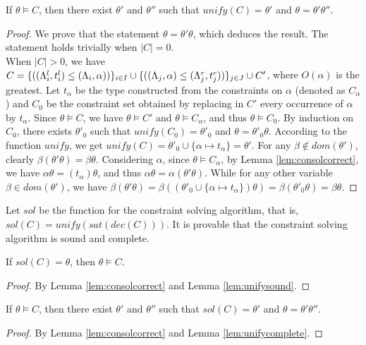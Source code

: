 {{{\begin{lemma}\label{lem:unifycomplete}
If $\theta \vDash C$, then there exist $\theta'$ and $\theta''$ such that $unify(C) = \theta'$ and $\theta = \theta'\theta''$.
\end{lemma}
\begin{proof}
We prove that the statement $\theta = \theta'\theta$, which deduces the result. The statement holds trivially when $|C| = 0$. \\
When $|C| > 0$, we have $C = \{((\Lambda_i^l,t_i^l)\leq(\Lambda_i,\alpha))\}_{i\in I} \cup \{((\Lambda_j,\alpha)\leq(\Lambda_j^r,t_j^r))\}_{j\in J}\cup C'$, where $O(\alpha)$ is the greatest.
Let $t_\alpha$ be the type constructed from the constraints on $\alpha$ (denoted as $C_{\alpha}$) and $C_0$ be the constraint set obtained by replacing in $C'$ every occurrence of $\alpha$ by $t_{\alpha}$.
Since $\theta \vDash C$, we have $\theta\vDash C'$ and $\theta \vDash  C_{\alpha}$,
and  thus $\theta\vDash C_0$.
By induction on $C_0$, there exists $\theta'_0$ such that $unify(C_0) = \theta'_0$ and $\theta = \theta'_0\theta$.
According to the function $unify$, we get $unify(C) = \theta'_0\cup\{\alpha\mapsto t_\alpha\} =\theta'$.
For any $\beta\notin dom(\theta')$, clearly $\beta(\theta'\theta) = \beta\theta$.
Considering $\alpha$, since $\theta\vDash C_{\alpha}$, by Lemma \ref{lem:consolcorrect}, we have $\alpha\theta =  (t_\alpha)\theta$, and thus $\alpha\theta = \alpha(\theta'\theta)$.
While for any other variable $\beta \in dom(\theta')$, we have
$\beta(\theta'\theta) = \beta((\theta'_0\cup\{\alpha\mapsto t_\alpha\})\theta)
= \beta(\theta'_0\theta)=\beta\theta$.
\end{proof}


Let $sol$ be the function for the constraint solving algorithm, that is, $sol(C) = unify(sat(dec(C)))$.
It is provable that the constraint solving algorithm is sound and complete.


\begin{lemma}\label{lem:solsound}
If $sol(C) = \theta$, then $\theta \vDash C$.
\end{lemma}
\begin{proof}
By Lemma  \ref{lem:consolcorrect} and Lemma \ref{lem:unifysound}.
\end{proof}

\begin{lemma}\label{lem:solcomplete}
If $\theta \vDash C$, then there exist $\theta'$ and $\theta''$ such that $sol(C) = \theta'$ and $\theta = \theta'\theta''$.
\end{lemma}
\begin{proof}
By Lemma  \ref{lem:consolcorrect} and Lemma \ref{lem:unifycomplete}.
\end{proof}


}}}
